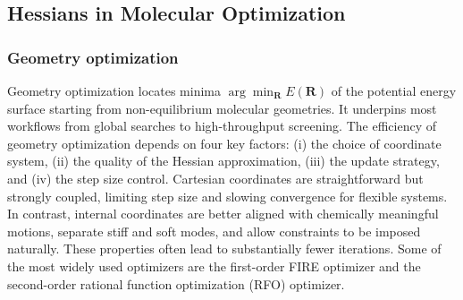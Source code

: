 \documentclass[pdflatex,sn-mathphys-num]{sn-jnl}%
\theoremstyle{thmstyleone}%
\theoremstyle{thmstyletwo}%
\theoremstyle{thmstylethree}%
\begin{document}
\begin{appendices}
\subsection{Hessians in Molecular Optimization}

\subsubsection{Geometry optimization \label{sec:optimizerliterature}}
Geometry optimization locates minima $\arg\!\min_\mathbf{R} E(\mathbf{R})$ of the potential energy surface starting from non-equilibrium molecular geometries. It underpins most workflows from global searches to high-throughput screening. 
The efficiency of geometry optimization depends on four key factors: (i) the choice of coordinate system, (ii) the quality of the Hessian approximation, (iii) the update strategy, and (iv) the step size control. 
Cartesian coordinates are straightforward but strongly coupled, limiting step size and slowing convergence for flexible systems. In contrast, internal coordinates are better aligned with chemically meaningful motions, separate stiff and soft modes, and allow constraints to be imposed naturally. These properties often lead to substantially fewer iterations. 
Some of the most widely used optimizers are the first-order FIRE \citep{bitzek2006} optimizer and the second-order rational function optimization (RFO) optimizer.


\end{appendices}
\end{document}
